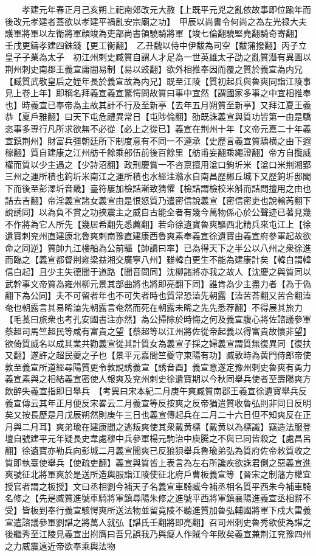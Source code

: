 　　孝建元年春正月己亥朔上祀南郊改元大赦【上既平元兇之亂依故事即位踰年而後改元孝建者蓋欲以孝建平禍亂安宗廟之功】　甲辰以尚書令何尚之為左光禄大夫護軍將軍以左衛將軍顔竣為吏部尚書領驍騎將軍【竣七倫翻驍堅堯翻騎奇寄翻】　壬戌更鑄孝建四銖錢【更工衡翻】　乙丑魏以侍中伊馛為司空【馛蒲撥翻】丙子立皇子子業為太子　初江州刺史臧質自謂人才足為一世英雄太子劭之亂質潛有異圖以荆州刺史南郡王義宣庸闇易制【易以豉翻】欲外相推奉因而覆之質於義宣為内兄【臧質武敬皇后之姪年長於義宣故為内兄】既至江陵【質初起兵與魯爽同詣江陵事見上卷上年】即稱名拜義宣義宣驚愕問故質曰事中宜然【謂國家多事之中宜相推奉也】時義宣已奉帝為主故其計不行及至新亭【去年五月朔質至新亭】又拜江夏王義恭【夏戶雅翻】曰天下屯危禮異常日【屯陟倫翻】劭既誅義宣與質功皆第一由是驕恣事多專行凡所求欲無不必從【必上之從已】義宣在荆州十年【文帝元嘉二十年義宣鎮荆州】財富兵彊朝廷所下制度意有不同一不遵承【史歷言義宣質驕横之由下遐稼翻】質自建康之江州舫千餘乘部伍前後百餘里【舫甫妄翻乘繩證翻】帝方自攬威權而質以少主遇之【少詩沼翻】政刑慶賞一不咨禀擅用湓口鉤圻米【湓口米荆湘郢三州之運所積也鉤圻米南江之運所積也水經注灨水自南昌歷郴丘城下又歷鉤圻邸閣下而後至彭澤圻音畿】臺符屢加檢詰漸致猜懼【檢詰謂檢校米斛而詰問擅用之由也詰去吉翻】帝淫義宣諸女義宣由是恨怒質乃遣密信說義宣【密信密吏也說輸芮翻下說誘同】以為負不賞之功挾震主之威自古能全者有幾今萬物係心於公聲迹已著見幾不作將為它人所先【幾居希翻先悉薦翻】若命徐遺寶魯爽驅西北精兵來屯江上【徐遺寶刺兖州直建康北魯爽刺南豫直建康西魯爽素奉義宣徐遺寶由義宣府參軍起故欲命之同逆】質帥九江樓船為公前驅【帥讀曰率】已為得天下之半公以八州之衆徐進而臨之【義宣都督荆雍梁益湘交廣寧八州】雖韓白更生不能為建康計矣【韓白謂韓信白起】且少主失德聞于道路【聞音問同】沈柳諸將亦我之故人【沈慶之與質同以武幹事文帝質為雍州柳元景其部曲將也將即亮翻下同】誰肯為少主盡力者【為于偽翻下為公同】夫不可留者年也不可失者時也質常恐溘先朝露【溘苦荅翻又苦合翻溘奄也朝露言其易晞溘先朝露言奄然而死在朝露未晞之先先悉荐翻】不得展其旅力【毛萇曰旅衆也考孔安國書注亦然】為公掃除於時悔之何及義宣腹心將佐諮議參軍蔡超司馬竺超民等咸有富貴之望【蔡超等以江州將佐從帝起義以得富貴故懷非望】欲倚質威名以成其業共勸義宣從其計質女為義宣子採之婦義宣謂質無復異同【復扶又翻】遂許之超民夔之子也【景平元嘉間竺夔守東陽有功】臧敦時為黄門侍郎帝使敦至義宣所道經尋陽質更令敦說誘義宣【誘音酉】義宣意遂定豫州刺史魯爽有勇力義宣素與之相結義宣密使人報爽及兖州刺史徐遺寶期以今秋同舉兵使者至壽陽爽方飲醉失義宣指即日舉兵　【考異曰宋本紀二月庚午爽臧質南郡王義宣徐遺寶舉兵反義宣傳云其年正月便反宋畧云二月義宣等反按爽之反帝猶遣質收魯弘則非同日反明矣又按長歷是月戊辰朔然則庚午三日也義宣傳起兵在二月二十六日但不知爽反在正月與二月耳】爽弟瑜在建康聞之逃叛爽使其衆戴黄標【戴黄以為標識】竊造法服登壇自號建平元年疑長史韋處穆中兵參軍楊元駒治中庾騰之不與已同皆殺之【處昌呂翻】徐遺寶亦勒兵向彭城二月義宣聞爽已反狼狽舉兵魯瑜弟弘為質府佐帝敕質收之質即執臺使舉兵【使疏吏翻】義宣與質皆上表言為左右所讒疾欲誅君側之惡義宣進爽號征北將軍爽於是送所造輿服詣江陵使征北府戶曹板義宣等【晉宋之制藩方權宜授官者謂之板授】文曰丞相劉今補天子名義宣車騎臧今補丞相名質平西朱今補車騎名修之【先是臧質進號車騎將軍鎮尋陽朱修之進號平西將軍鎮襄陽進義宣丞相辭不受】皆板到奉行義宣駭愕爽所送法物並留竟陵不聽進質加魯弘輔國將軍下戍大雷義宣遣諮議參軍劉諶之將萬人就弘【諶氏壬翻將即亮翻】召司州刺史魯秀欲使為諶之後繼秀至江陵見義宣出拊膺曰吾兄誤我乃與癡人作賊今年敗矣義宣兼荆江兖豫四州之力威震遠近帝欲奉乘輿法物